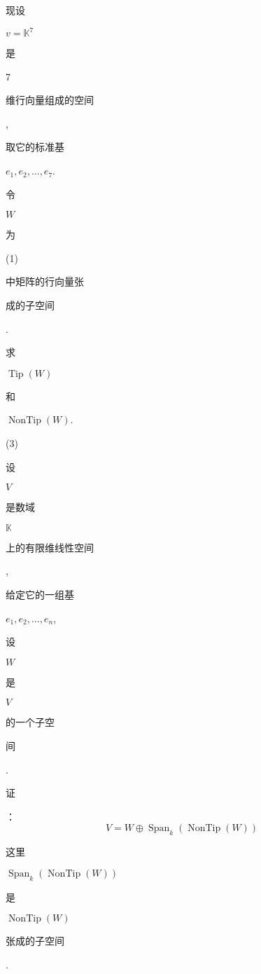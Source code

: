 \documentclass[10pt]{article}
\begin{document}
\begin{CJK}{UTF8}{mj}现设\end{CJK} $v=\mathbb{K}^{7}$ \begin{CJK}{UTF8}{mj}是\end{CJK} 7 \begin{CJK}{UTF8}{mj}维行向量组成的空间\end{CJK}, \begin{CJK}{UTF8}{mj}取它的标准基\end{CJK} $e_{1}, e_{2}, \ldots, e_{7}$. \begin{CJK}{UTF8}{mj}令\end{CJK} $W$ \begin{CJK}{UTF8}{mj}为\end{CJK} (1) \begin{CJK}{UTF8}{mj}中矩阵的行向量张\end{CJK} \begin{CJK}{UTF8}{mj}成的子空间\end{CJK}. \begin{CJK}{UTF8}{mj}求\end{CJK} $\operatorname{Tip}(W)$ \begin{CJK}{UTF8}{mj}和\end{CJK} $\operatorname{NonTip}(W)$.

(3) \begin{CJK}{UTF8}{mj}设\end{CJK} $V$ \begin{CJK}{UTF8}{mj}是数域\end{CJK} $\mathbb{K}$ \begin{CJK}{UTF8}{mj}上的有限维线性空间\end{CJK},\begin{CJK}{UTF8}{mj}给定它的一组基\end{CJK} $e_{1}, e_{2}, \ldots, e_{n}$, \begin{CJK}{UTF8}{mj}设\end{CJK} $W$ \begin{CJK}{UTF8}{mj}是\end{CJK} $V$ \begin{CJK}{UTF8}{mj}的一个子空\end{CJK} \begin{CJK}{UTF8}{mj}间\end{CJK}. \begin{CJK}{UTF8}{mj}证\end{CJK}：
$$
V=W \oplus \operatorname{Span}_{k}(\operatorname{NonTip}(W))
$$
\begin{CJK}{UTF8}{mj}这里\end{CJK} $\operatorname{Span}_{k}(\operatorname{NonTip}(W))$ \begin{CJK}{UTF8}{mj}是\end{CJK} $\operatorname{NonTip}(W)$ \begin{CJK}{UTF8}{mj}张成的子空间\end{CJK}.
\end{document}

